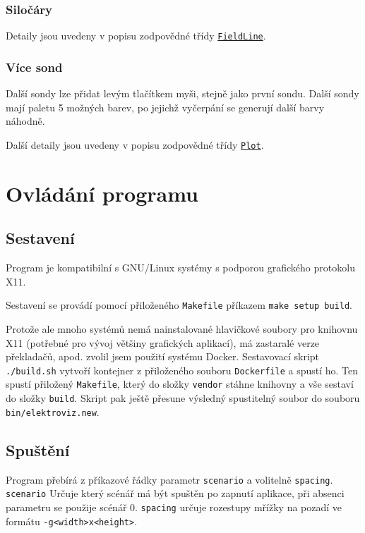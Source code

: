\documentclass[12pt,a4paper]{article}
\newcommand{\code}[1]{\texttt{#1}}
\begin{document}
\subsubsection{Siločáry}

Detaily jsou uvedeny v popisu zodpovědné třídy
\hyperref[sec:fieldline]{\code{FieldLine}}.

\subsubsection{Více sond}

Další sondy lze přidat levým tlačítkem myši, stejně jako první sondu. Další
sondy mají paletu 5 možných barev, po jejichž vyčerpání se generují další barvy
náhodně.

Další detaily jsou uvedeny v popisu zodpovědné třídy
\hyperref[sec:plot]{\code{Plot}}.

\section{Ovládání programu}

\subsection{Sestavení}

Program je kompatibilní s GNU/Linux systémy s podporou grafického protokolu X11.

Sestavení se provádí pomocí přiloženého \code{Makefile} příkazem \code{make
setup build}.

Protože ale mnoho systémů nemá nainstalované hlavičkové soubory pro knihovnu X11
(potřebné pro vývoj většiny grafických aplikací), má zastaralé verze překladačů,
apod. zvolil jsem použití systému Docker. Sestavovací skript \code{./build.sh}
vytvoří kontejner z přiloženého souboru \code{Dockerfile} a spustí ho. Ten 
spustí přiložený \code{Makefile}, který do složky \code{vendor} stáhne knihovny
a vše sestaví do složky \code{build}. Skript pak ještě přesune výsledný
spustitelný soubor do souboru \code{bin/elektroviz.new}.

\subsection{Spuštění}

Program přebírá z příkazové řádky parametr \code{scenario} a volitelně
\code{spacing}. \code{scenario} Určuje který scénář má být spuštěn po zapnutí
aplikace, při absenci parametru se použije scénář 0. \code{spacing} určuje
rozestupy mřížky na pozadí ve formátu \code{-g<width>x<height>}.
\end{document}
